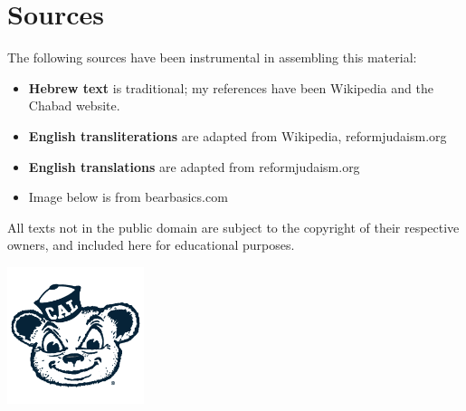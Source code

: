 \documentclass[letterpaper,10pt]{article}
\begin{document}
\section*{Sources}

The following sources have been instrumental in assembling this material:

\begin{itemize}
  \item {\bfseries Hebrew text} is traditional; my references have been Wikipedia and the Chabad website.
  \item {\bfseries English transliterations} are adapted from Wikipedia, reformjudaism.org
  \item {\bfseries English translations} are adapted from reformjudaism.org
  \item Image below is from bearbasics.com
\end{itemize}

\noindent
All texts not in the public domain are subject to the copyright of their
respective owners, and included here for educational purposes.

\vfill
\begin{center}
  \includegraphics[width=4cm]{oski.png}
\end{center}
\end{document}

